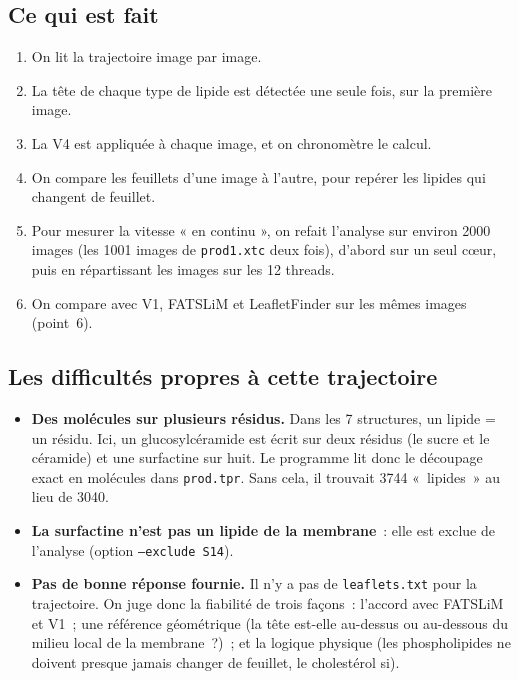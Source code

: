 \documentclass[11pt,a4paper]{article}
\newcommand{\f}[1]{\texttt{#1}}
\begin{document}
\subsection{Ce qui est fait}
\begin{enumerate}
\item On lit la trajectoire image par image.
\item La tête de chaque type de lipide est détectée une seule fois, sur la première image.
\item La V4 est appliquée à chaque image, et on chronomètre le calcul.
\item On compare les feuillets d'une image à l'autre, pour repérer les lipides qui changent de feuillet.
\item Pour mesurer la vitesse « en continu », on refait l'analyse sur environ 2000 images (les 1001 images de
\f{prod1.xtc} deux fois), d'abord sur un seul cœur, puis en répartissant les images sur les 12 threads.
\item On compare avec V1, FATSLiM et LeafletFinder sur les mêmes images (point~6).
\end{enumerate}

\subsection{Les difficultés propres à cette trajectoire}
\begin{itemize}
\item \textbf{Des molécules sur plusieurs résidus.} Dans les 7 structures, un lipide = un résidu. Ici, un
glucosylcéramide est écrit sur deux résidus (le sucre et le céramide) et une surfactine sur huit. Le programme lit
donc le découpage exact en molécules dans \f{prod.tpr}. Sans cela, il trouvait 3744 «~lipides~» au lieu de 3040.
\item \textbf{La surfactine n'est pas un lipide de la membrane}~: elle est exclue de l'analyse (option
\f{--exclude S14}).
\item \textbf{Pas de bonne réponse fournie.} Il n'y a pas de \f{leaflets.txt} pour la trajectoire. On juge donc la
fiabilité de trois façons~: l'accord avec FATSLiM et V1~; une référence géométrique (la tête est-elle au-dessus ou
au-dessous du milieu local de la membrane~?)~; et la logique physique (les phospholipides ne doivent presque jamais
changer de feuillet, le cholestérol si).
\end{itemize}
\end{document}
